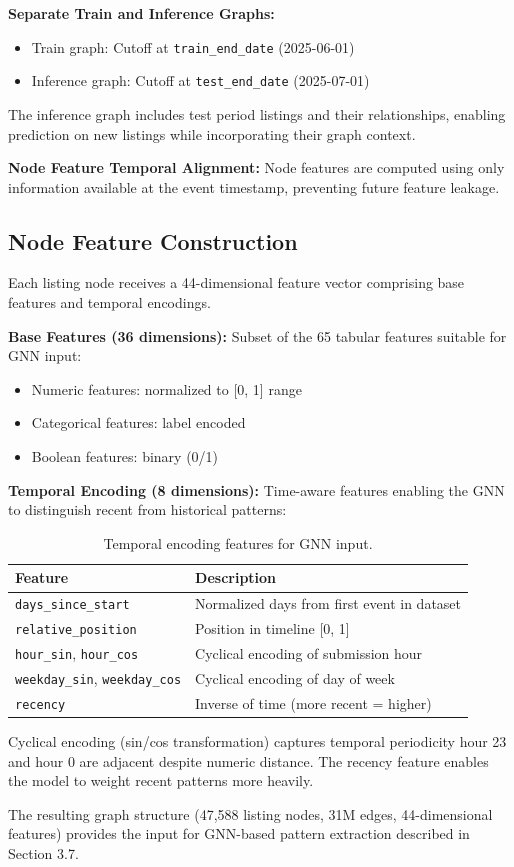 \textbf{Separate Train and Inference Graphs:}
\begin{itemize}
    \item Train graph: Cutoff at \texttt{train\_end\_date} (2025-06-01)
    \item Inference graph: Cutoff at \texttt{test\_end\_date} (2025-07-01)
\end{itemize}

The inference graph includes test period listings and their relationships, enabling prediction on new listings while incorporating their graph context.

\textbf{Node Feature Temporal Alignment:} Node features are computed using only information available at the event timestamp, preventing future feature leakage.

\subsection{Node Feature Construction}

Each listing node receives a 44-dimensional feature vector comprising base features and temporal encodings.

\textbf{Base Features (36 dimensions):} Subset of the 65 tabular features suitable for GNN input:
\begin{itemize}
    \item Numeric features: normalized to [0, 1] range
    \item Categorical features: label encoded
    \item Boolean features: binary (0/1)
\end{itemize}

\textbf{Temporal Encoding (8 dimensions):} Time-aware features enabling the GNN to distinguish recent from historical patterns:

\begin{table}[h]
\centering
\caption{Temporal encoding features for GNN input.}
\begin{tabular}{ll}
\hline
Feature & Description \\
\hline
\texttt{days\_since\_start} & Normalized days from first event in dataset \\
\texttt{relative\_position} & Position in timeline [0, 1] \\
\texttt{hour\_sin}, \texttt{hour\_cos} & Cyclical encoding of submission hour \\
\texttt{weekday\_sin}, \texttt{weekday\_cos} & Cyclical encoding of day of week \\
\texttt{recency} & Inverse of time (more recent = higher) \\
\hline
\end{tabular}
\end{table}

Cyclical encoding (sin/cos transformation) captures temporal periodicity hour 23 and hour 0 are adjacent despite numeric distance. The recency feature enables the model to weight recent patterns more heavily.

The resulting graph structure (47,588 listing nodes, 31M edges, 44-dimensional features) provides the input for GNN-based pattern extraction described in Section 3.7.
